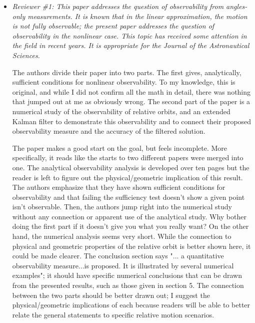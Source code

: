 \documentclass[11pt]{article}
\begin{document}
\begin{itemize}\setlength{\itemsep}{2\parsep}

\item {\itshape Reviewer \#1: This paper addresses the question of observability from angles-only measurements. It is known that in the linear approximation, the motion is not fully observable; the present paper addresses the question of observability in the nonlinear case. This topic has received some attention in the field in recent years. It is appropriate for the Journal of the Astronautical Sciences.

   The authors divide their paper into two parts. The first gives, analytically, sufficient conditions for nonlinear observability. To my knowledge, this is original, and while I did not confirm all the math in detail, there was nothing that jumped out at me as obviously wrong. The second part of the paper is a numerical study of the observability of relative orbits, and an extended Kalman filter to demonstrate this observability and to connect their proposed observability measure and the accuracy of the filtered solution.

   The paper makes a good start on the goal, but feels incomplete. More specifically, it reads like the starts to two different papers were merged into one. The analytical observability analysis is developed over ten pages but the reader is left to figure out the physical/geometric implication of this result. The authors emphasize that they have shown sufficient conditions for observability and that failing the sufficiency test doesn't show a given point isn't observable. Then, the authors jump right into the numerical study without any connection or apparent use of the analytical study. Why bother doing the first part if it doesn't give you what you really want? On the other hand, the numerical analysis seems very short. While the connection to physical and geometric properties of the relative orbit is better shown here, it could be made clearer. The conclusion section says "... a quantitative observability measure...is proposed. It is illustrated by several numerical
examples"; it should have specific numerical conclusions that can be drawn from the presented results, such as those given in section 5. The connection between the two parts should be better drawn out; I suggest the physical/geometric implications of each because readers will be able to better relate the general statements to specific relative motion scenarios.$ $}\\


\end{itemize}
\end{document}
